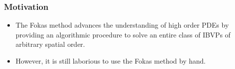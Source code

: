 \documentclass{beamer}
\begin{document}
\begin{frame}[t]
    \frametitle{Motivation}
    \begin{itemize}
        \item The Fokas method advances the understanding of high order PDEs by providing an algorithmic procedure to solve an entire class of IBVPs of arbitrary spatial order.
        \item However, it is still laborious to use the Fokas method by hand.
    \end{itemize}
\end{frame}
\end{document}
